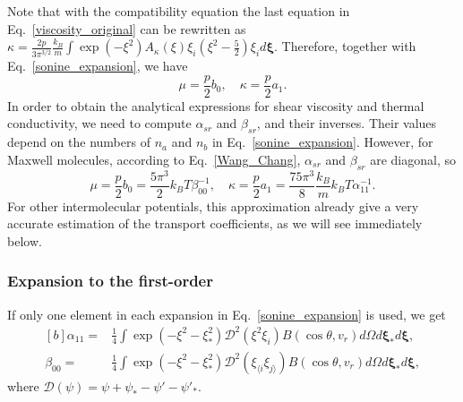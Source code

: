 Note that with the compatibility equation the last equation in Eq.~\eqref{viscosity_original} can be rewritten as
	$
	\kappa=\frac{2p}{3\pi^{3/2}}
	\frac{k_B}{m}
	\int\exp(-\xi^2)A_\kappa(\xi)\xi_i
	\left(\xi^2-\frac{5}{2}\right)
	\xi_i
	d\bm{\xi}$.
Therefore, together with Eq.~\eqref{sonine_expansion}, we have
\begin{equation}\label{viscosity_general_fundamental}
\mu=\frac{p}{2}b_0, 
\quad
\kappa=\frac{p}{2}a_1.
\end{equation}
In order to obtain the analytical expressions for shear viscosity and thermal conductivity, we need to compute $\alpha_{sr}$ and $\beta_{sr}$, and their inverses. %
Their values depend on the numbers of $n_a$ and $n_b$ in Eq.~\eqref{sonine_expansion}. However, for Maxwell molecules, according to Eq.~\eqref{Wang_Chang}, $\alpha_{sr}$ and $\beta_{sr}$ are diagonal, so 
\begin{equation}\label{viscosity_general}
\mu=\frac{p}{2}b_0=\frac{5\pi^3}{2}k_BT\beta^{-1}_{00}, 
\quad
\kappa=\frac{p}{2}a_1=\frac{75\pi^3}{8}\frac{k_B}{m}k_BT\alpha^{-1}_{11}.
\end{equation}
For other intermolecular potentials, this approximation already give a very accurate estimation of the transport coefficients, as we will see immediately below.





\subsubsection{Expansion to the first-order}


If only one element in each expansion in Eq.~\eqref{sonine_expansion} is used, we get 
\begin{equation}\label{alpha_beta}
\begin{aligned}[b]
\alpha_{11}
=&\frac{1}{4}\int \exp(-\xi^2-\xi^2_\ast)
\mathcal{D}^2(\xi^2\xi_i)B(\cos\theta,v_r)d\Omega{d\bm{\xi}_\ast}d\bm{\xi},\\
\beta_{00}=&\frac{1}{4}\int \exp(-\xi^2-\xi^2_\ast)
\mathcal{D}^2(\xi_{\langle{i}}\xi_{j\rangle})
B(\cos\theta,v_r)
d\Omega{d\bm{\xi}_\ast}d\bm{\xi},
\end{aligned}
\end{equation}
where $\mathcal{D}(\psi)=\psi+\psi_\ast-\psi'-\psi'_\ast$. 

